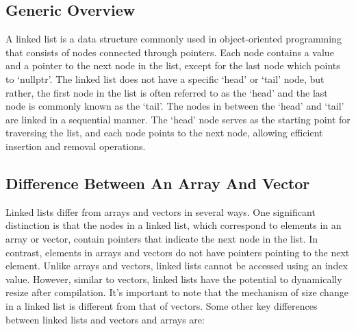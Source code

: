 \documentclass[a4paper,9pt]{article}
\begin{document}
\subsection*{Generic Overview}

A linked list is a data structure commonly used in object-oriented programming that consists of nodes connected through 
pointers. Each node contains a value and a pointer to the next node in the list, except for the last node which points 
to `nullptr'. The linked list does not have a specific `head' or `tail' node, but rather, the first node in the list is 
often referred to as the `head' and the last node is commonly known as the `tail'. The nodes in between the `head' and 
`tail' are linked in a sequential manner. The `head' node serves as the starting point for traversing the list, and each 
node points to the next node, allowing efficient insertion and removal operations.

\subsection*{Difference Between An Array And Vector}

Linked lists differ from arrays and vectors in several ways. One significant distinction is that the nodes in a linked list, 
which correspond to elements in an array or vector, contain pointers that indicate the next node in the list. In contrast, 
elements in arrays and vectors do not have pointers pointing to the next element. Unlike arrays and vectors, linked lists 
cannot be accessed using an index value. However, similar to vectors, linked lists have the potential to dynamically resize 
after compilation. It's important to note that the mechanism of size change in a linked list is different from that of vectors.
Some other key differences between linked lists and vectors and arrays are:
\end{document}
